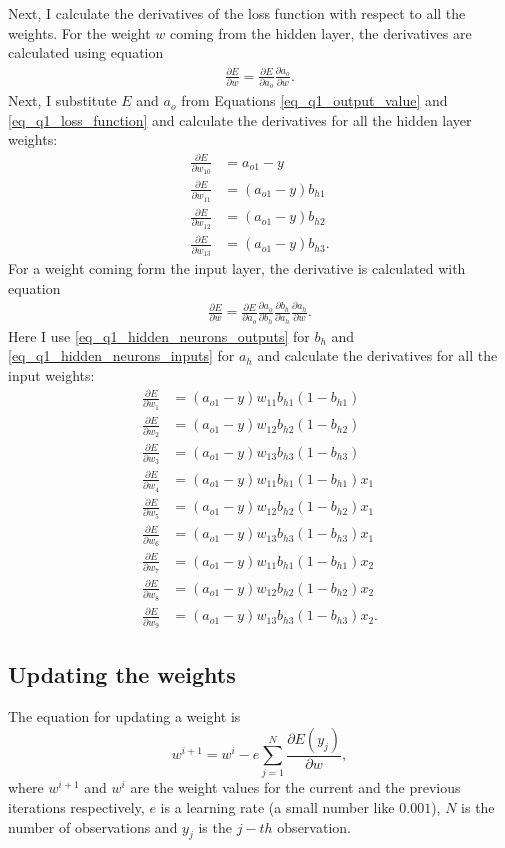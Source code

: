 Next, I calculate the derivatives of the loss function with respect to all the weights. For the weight $w$ coming from the hidden layer, the derivatives are calculated using equation
\begin{align*}
  \frac{\partial E}{\partial w} = \frac{\partial E}{\partial a_o} \frac{\partial a_o} {\partial w}.
\end{align*}
Next, I substitute $E$ and $a_o$ from Equations \ref{eq_q1_output_value} and \ref{eq_q1_loss_function} and calculate the derivatives for all the hidden layer weights:
\begin{align*}
  \frac{\partial E}{\partial w_{10}} &= a_{o1} - y \\
  \frac{\partial E}{\partial w_{11}} &= (a_{o1} - y) b_{h1} \\
  \frac{\partial E}{\partial w_{12}} &= (a_{o1} - y) b_{h2} \\
  \frac{\partial E}{\partial w_{13}} &= (a_{o1} - y) b_{h3}.
\end{align*}
For a weight coming form the input layer, the derivative is calculated with equation
\begin{align*}
  \frac{\partial E}{\partial w} = \frac{\partial E}{\partial a_o} \frac{\partial a_o} {\partial b_h} \frac{\partial b_h} {\partial a_h} \frac{\partial a_h} {\partial w}.
\end{align*}
Here I use \autoref{eq_q1_hidden_neurons_outputs} for $b_h$ and \autoref{eq_q1_hidden_neurons_inputs} for $a_h$ and calculate the derivatives for all the input weights:
\begin{align*}
  \frac{\partial E}{\partial w_{1}} &= (a_{o1} - y) w_{11} b_{h1} (1 - b_{h1}) \\
  \frac{\partial E}{\partial w_{2}} &= (a_{o1} - y) w_{12} b_{h2} (1 - b_{h2}) \\
  \frac{\partial E}{\partial w_{3}} &= (a_{o1} - y) w_{13} b_{h3} (1 - b_{h3}) \\
  \frac{\partial E}{\partial w_{4}} &= (a_{o1} - y) w_{11} b_{h1} (1 - b_{h1}) x_1 \\
  \frac{\partial E}{\partial w_{5}} &= (a_{o1} - y) w_{12} b_{h2} (1 - b_{h2}) x_1 \\
  \frac{\partial E}{\partial w_{6}} &= (a_{o1} - y) w_{13} b_{h3} (1 - b_{h3}) x_1 \\
  \frac{\partial E}{\partial w_{7}} &= (a_{o1} - y) w_{11} b_{h1} (1 - b_{h1}) x_2 \\
  \frac{\partial E}{\partial w_{8}} &= (a_{o1} - y) w_{12} b_{h2} (1 - b_{h2}) x_2 \\
  \frac{\partial E}{\partial w_{9}} &= (a_{o1} - y) w_{13} b_{h3} (1 - b_{h3}) x_2.
\end{align*}

\subsection{Updating the weights}

The equation for updating a weight is
\[
  w^{i+1} = w^{i} - e \sum_{j=1}^{N} \frac{\partial E(y_j)}{\partial w},
\]
where $w^{i+1}$ and $w^{i}$ are the weight values for the current and the previous iterations respectively, $e$ is a learning rate (a small number like $0.001$), $N$ is the number of observations and $y_j$ is the $j-th$ observation.
